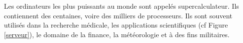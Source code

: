 Les ordinateurs les plus puissants au monde sont appelés supercalculateur. Ils contiennent des centaines, voire des milliers de processeurs. Ils sont souvent utilisés dans la recherche médicale, les applications scientifiques (cf Figure \ref{serveur}), le domaine de la finance, la météorologie et à des fins militaires.

